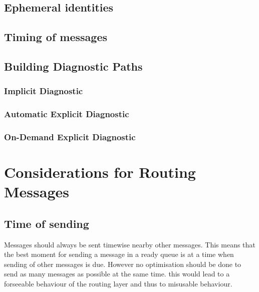 \subsection{Ephemeral identities}
\subsection{Timing of messages}

\subsection{Building Diagnostic Paths}

\subsubsection{Implicit Diagnostic}

\subsubsection{Automatic Explicit Diagnostic}

\subsubsection{On-Demand Explicit Diagnostic}

\section{Considerations for Routing Messages}
\subsection{Time of sending}
Messages should always be sent timewise nearby other messages. This means that the best moment for sending a message in a ready queue is at a time when sending of other messages is due. However no optimisation should be done to send as many messages as possible at the same time. this would lead to a forseeable behaviour of the routing layer and thus to misusable behaviour.



